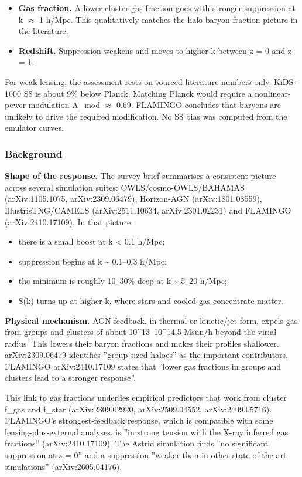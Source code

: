 \documentclass[11pt,a4paper]{article}
\begin{document}
\begin{itemize}
  \item \textbf{Gas fraction.} A lower cluster gas fraction goes with stronger suppression at k $\approx$ 1 h/Mpc. This qualitatively matches the halo-baryon-fraction picture in the literature.
  \item \textbf{Redshift.} Suppression weakens and moves to higher k between z = 0 and z = 1.
\end{itemize}
For weak lensing, the assessment rests on sourced literature numbers only. KiDS-1000 S8 is about 9\% below Planck. Matching Planck would require a nonlinear-power modulation A\_mod $\approx$ 0.69. FLAMINGO concludes that baryons are unlikely to drive the required modification. No S8 bias was computed from the emulator curves.

\subsubsection*{Background}
\textbf{Shape of the response.} The survey brief summarises a consistent picture across several simulation suites: OWLS/cosmo-OWLS/BAHAMAS (arXiv:1105.1075, arXiv:2309.06479), Horizon-AGN (arXiv:1801.08559), IllustrisTNG/CAMELS (arXiv:2511.10634, arXiv:2301.02231) and FLAMINGO (arXiv:2410.17109). In that picture:

\begin{itemize}
  \item there is a small boost at k \textless{} 0.1 h/Mpc;
  \item suppression begins at k \textasciitilde{} 0.1--0.3 h/Mpc;
  \item the minimum is roughly 10--30\% deep at k \textasciitilde{} 5--20 h/Mpc;
  \item S(k) turns up at higher k, where stars and cooled gas concentrate matter.
\end{itemize}
\textbf{Physical mechanism.} AGN feedback, in thermal or kinetic/jet form, expels gas from groups and clusters of about 10\textasciicircum{}13--10\textasciicircum{}14.5 Msun/h beyond the virial radius. This lowers their baryon fractions and makes their profiles shallower. arXiv:2309.06479 identifies ''group-sized haloes'' as the important contributors. FLAMINGO arXiv:2410.17109 states that ''lower gas fractions in groups and clusters lead to a stronger response''.

This link to gas fractions underlies empirical predictors that work from cluster f\_gas and f\_star (arXiv:2309.02920, arXiv:2509.04552, arXiv:2409.05716). FLAMINGO's strongest-feedback response, which is compatible with some lensing-plus-external analyses, is ''in strong tension with the X-ray inferred gas fractions'' (arXiv:2410.17109). The Astrid simulation finds ''no significant suppression at z = 0'' and a suppression ''weaker than in other state-of-the-art simulations'' (arXiv:2605.04176).
\end{document}
